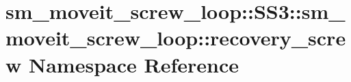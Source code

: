 \hypertarget{namespacesm__moveit__screw__loop_1_1SS3_1_1sm__moveit__screw__loop_1_1recovery__screw}{}\section{sm\+\_\+moveit\+\_\+screw\+\_\+loop\+:\+:S\+S3\+:\+:sm\+\_\+moveit\+\_\+screw\+\_\+loop\+:\+:recovery\+\_\+screw Namespace Reference}
\label{namespacesm__moveit__screw__loop_1_1SS3_1_1sm__moveit__screw__loop_1_1recovery__screw}
